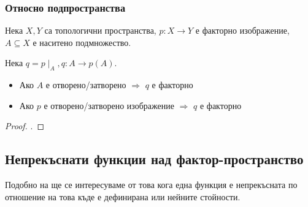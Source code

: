 \subsubsection{Относно подпространства}
\begin{theorem}
    Нека $X, Y$ са топологични пространства, $p: X \to Y$ е факторно изображение, $A \subseteq X$ е наситено подмножество. 

    Нека $q = p\mid_A, q: A \to p(A)$.
    \begin{itemize}
        \item Ако $A$ е отворено/затворено $\Rightarrow$ $q$ е факторно
        \item Ако $p$ е отворено/затворено изображение $\Rightarrow$ $q$ е факторно
    \end{itemize}
\end{theorem}
\begin{proof}
    \cite[стр.~140]{munkrestopology}.
\end{proof}

\subsection{Непрекъснати функции над фактор-пространство}

Подобно на  ще се интересуваме от това кога една функция е непрекъсната по отношение на това къде е дефинирана или нейните стойности.


